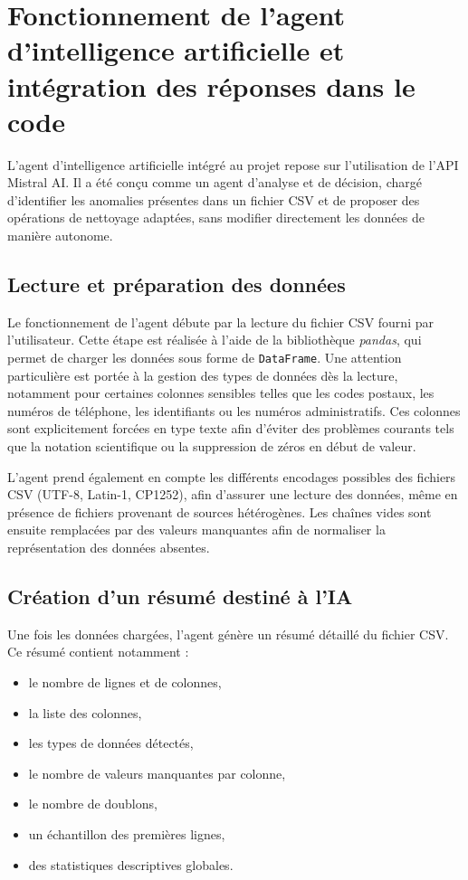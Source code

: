 \documentclass[a4paper, 12pt, twoside]{article}
\begin{document}
\newpage
\section{Fonctionnement de l’agent d’intelligence artificielle et intégration des réponses dans le code}

L’agent d’intelligence artificielle intégré au projet repose sur l’utilisation de l’API Mistral AI. Il a été conçu comme un agent d’analyse et de décision, chargé d’identifier les anomalies présentes dans un fichier CSV et de proposer des opérations de nettoyage adaptées, sans modifier directement les données de manière autonome.

\subsection{Lecture et préparation des données}

Le fonctionnement de l’agent débute par la lecture du fichier CSV fourni par l’utilisateur. Cette étape est réalisée à l’aide de la bibliothèque \textit{pandas}, qui permet de charger les données sous forme de \texttt{DataFrame}. Une attention particulière est portée à la gestion des types de données dès la lecture, notamment pour certaines colonnes sensibles telles que les codes postaux, les numéros de téléphone, les identifiants ou les numéros administratifs. Ces colonnes sont explicitement forcées en type texte afin d’éviter des problèmes courants tels que la notation scientifique ou la suppression de zéros en début de valeur.

L’agent prend également en compte les différents encodages possibles des fichiers CSV (UTF-8, Latin-1, CP1252), afin d’assurer une lecture des données, même en présence de fichiers provenant de sources hétérogènes. Les chaînes vides sont ensuite remplacées par des valeurs manquantes afin de normaliser la représentation des données absentes.

\subsection{Création d’un résumé destiné à l’IA}

Une fois les données chargées, l’agent génère un résumé détaillé du fichier CSV. Ce résumé contient notamment :
\begin{itemize}
    \item le nombre de lignes et de colonnes,
    \item la liste des colonnes,
    \item les types de données détectés,
    \item le nombre de valeurs manquantes par colonne,
    \item le nombre de doublons,
    \item un échantillon des premières lignes,
    \item des statistiques descriptives globales.
\end{itemize}
\end{document}
